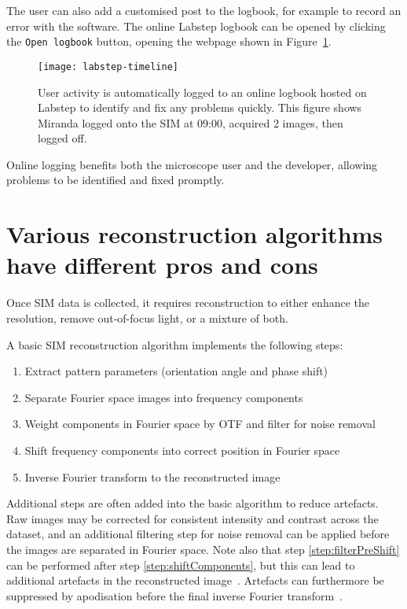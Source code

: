 The user can also add a customised post to the logbook, for example to record an error with the software. 
The online Labstep logbook can be opened by clicking the \texttt{Open logbook} button, opening the webpage shown in Figure~\ref{fig:labstepTimeline}. 

\begin{figure}[htbp!]
\centering
\texttt{[image: labstep-timeline]}
\caption[LAG SIM: Logging user activity with Labstep allows any problems to be identified and fixed quickly]{User activity is automatically logged to an online logbook hosted on Labstep to identify and fix any problems quickly. This figure shows Miranda logged onto the SIM at 09:00, acquired 2 images, then logged off.} %
\label{fig:labstepTimeline}
\end{figure}

Online logging benefits both the microscope user and the developer, allowing problems to be identified and fixed promptly. 


\section{Various reconstruction algorithms have different pros and cons} \label{sec:recon}
Once SIM data is collected, it requires reconstruction to either enhance the resolution, remove out-of-focus light, or a mixture of both.

A basic SIM reconstruction algorithm implements the following steps:
\begin{enumerate}
	\item Extract pattern parameters (orientation angle and phase shift)
	\item Separate Fourier space images into frequency components
	\item \label{step:filterPreShift}Weight components in Fourier space by OTF and filter for noise removal
	\item \label{step:shiftComponents}Shift frequency components into correct position in Fourier space
	\item Inverse Fourier transform to the reconstructed image
\end{enumerate}

Additional steps are often added into the basic algorithm to reduce artefacts. 
Raw images may be corrected for consistent intensity and contrast across the dataset, and an additional filtering step for noise removal can be applied before the images are separated in Fourier space. 
Note also that step \ref{step:filterPreShift} can be performed after step \ref{step:shiftComponents}, but this can lead to additional artefacts in the reconstructed image~\cite{gustafsson2008three}. 
Artefacts can furthermore be suppressed by apodisation before the final inverse Fourier transform~\cite{gustafsson2008three}. 

